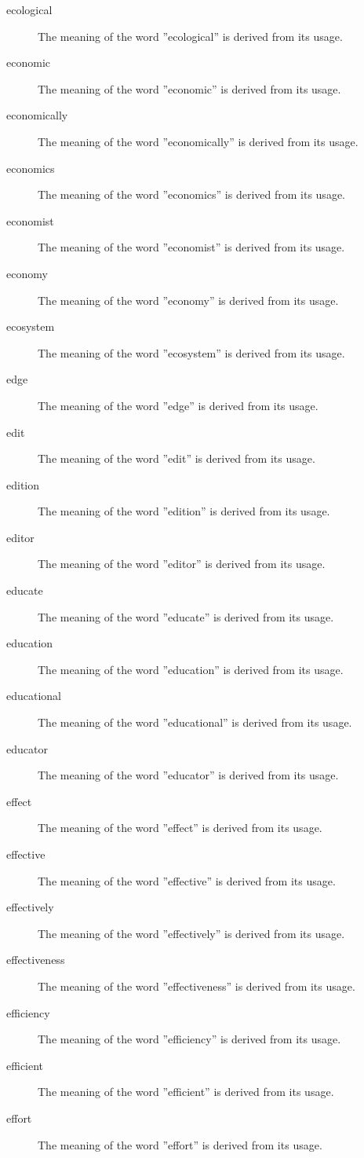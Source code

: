 \documentclass[12pt, letterpaper]{memoir}
\begin{document}
\begin{description}
\item[ecological] The meaning of the word ''ecological'' is derived from its usage.
\item[economic] The meaning of the word ''economic'' is derived from its usage.
\item[economically] The meaning of the word ''economically'' is derived from its usage.
\item[economics] The meaning of the word ''economics'' is derived from its usage.
\item[economist] The meaning of the word ''economist'' is derived from its usage.
\item[economy] The meaning of the word ''economy'' is derived from its usage.
\item[ecosystem] The meaning of the word ''ecosystem'' is derived from its usage.
\item[edge] The meaning of the word ''edge'' is derived from its usage.
\item[edit] The meaning of the word ''edit'' is derived from its usage.
\item[edition] The meaning of the word ''edition'' is derived from its usage.
\item[editor] The meaning of the word ''editor'' is derived from its usage.
\item[educate] The meaning of the word ''educate'' is derived from its usage.
\item[education] The meaning of the word ''education'' is derived from its usage.
\item[educational] The meaning of the word ''educational'' is derived from its usage.
\item[educator] The meaning of the word ''educator'' is derived from its usage.
\item[effect] The meaning of the word ''effect'' is derived from its usage.
\item[effective] The meaning of the word ''effective'' is derived from its usage.
\item[effectively] The meaning of the word ''effectively'' is derived from its usage.
\item[effectiveness] The meaning of the word ''effectiveness'' is derived from its usage.
\item[efficiency] The meaning of the word ''efficiency'' is derived from its usage.
\item[efficient] The meaning of the word ''efficient'' is derived from its usage.
\item[effort] The meaning of the word ''effort'' is derived from its usage.

\end{description}
\end{document}
